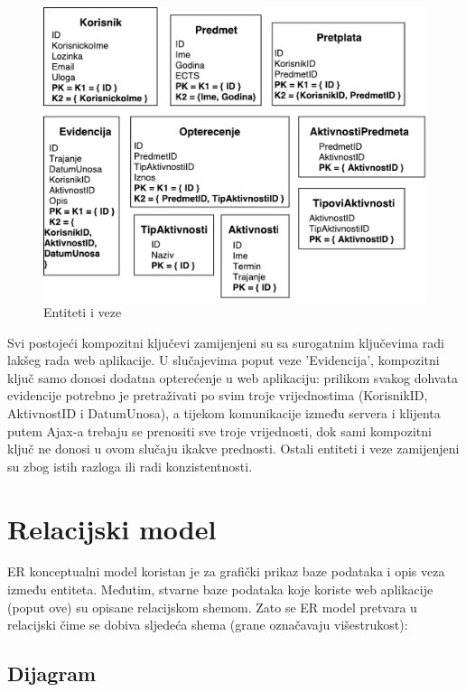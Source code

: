 \documentclass[times, utf8, zavrsni]{fer}
\begin{document}
\begin{figure}[H]
\centering
\includegraphics[scale=0.8]{img/er-model-opis.pdf}
\caption{Entiteti i veze}
\label{fig:er-model-opis}
\end{figure}

Svi postojeći kompozitni ključevi zamijenjeni su sa surogatnim ključevima radi lakšeg rada web aplikacije. U slučajevima poput veze 'Evidencija', kompozitni ključ samo donosi dodatna opterećenje u web aplikaciju: prilikom svakog dohvata evidencije potrebno je pretraživati po svim troje vrijednostima (KorisnikID, AktivnostID i DatumUnosa), a tijekom komunikacije između servera i klijenta putem Ajax-a trebaju se prenositi sve troje vrijednosti, dok sami kompozitni ključ ne donosi u ovom slučaju ikakve prednosti. Ostali entiteti i veze zamijenjeni su zbog istih razloga ili radi konzistentnosti.

\section{Relacijski model}

ER konceptualni model koristan je za grafički prikaz baze podataka i opis veza između entiteta. Međutim, stvarne baze podataka koje koriste web aplikacije (poput ove) su opisane relacijskom shemom. Zato se ER model pretvara u relacijski čime se dobiva sljedeća shema (grane označavaju višestrukost):

\subsection{Dijagram}
\end{document}
